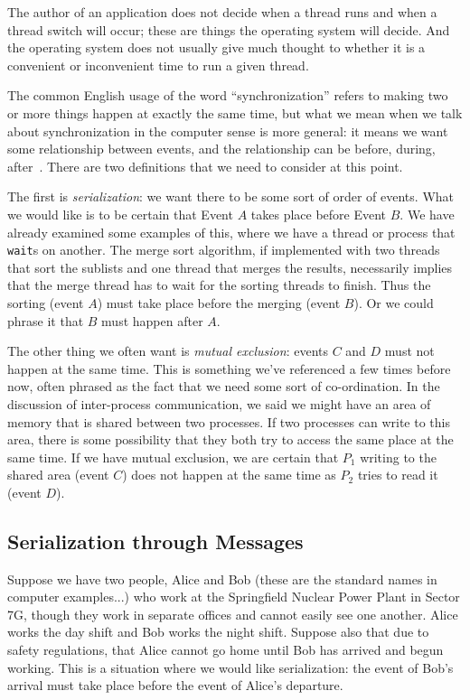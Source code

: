 \documentclass[a4paper]{report}
\begin{document}
The author of an application does not decide when a thread runs and when a thread switch will occur; these are things the operating system will decide. And the operating system does not usually give much thought to whether it is a convenient or inconvenient time to run a given thread.

The common English usage of the word ``synchronization'' refers to making two or more things happen at exactly the same time, but what we mean when we talk about synchronization in the computer sense is more general: it means we want some relationship between events, and the relationship can be before, during, after~\cite{lbs}. There are two definitions that we need to consider at this point.

The first is \textit{serialization}: we want there to be some sort of order of events. What we would like is to be certain that Event $A$ takes place before Event $B$. We have already examined some examples of this, where we have a thread or process that \texttt{wait}s on another. The merge sort algorithm, if implemented with two threads that sort the sublists and one thread that merges the results, necessarily implies that the merge thread has to wait for the sorting threads to finish. Thus the sorting (event $A$) must take place before the merging (event $B$). Or we could phrase it that $B$ must happen after $A$.

The other thing we often want is \textit{mutual exclusion}: events $C$ and $D$ must not happen at the same time. This is something we've referenced a few times before now, often phrased as the fact that we need some sort of co-ordination. In the discussion of inter-process communication, we said we might have an area of memory that is shared between two processes. If two processes can write to this area, there is some possibility that they both try to access the same place at the same time. If we have mutual exclusion, we are certain that $P_{1}$ writing to the shared area (event $C$) does not happen at the same time as $P_{2}$ tries to read it (event $D$).



\subsection*{Serialization through Messages}

Suppose we have two people, Alice and Bob (these are the standard names in computer examples...) who work at the Springfield Nuclear Power Plant in Sector 7G, though they work in separate offices and cannot easily see one another. Alice works the day shift and Bob works the night shift. Suppose also that due to safety regulations, that Alice cannot go home until Bob has arrived and begun working. This is a situation where we would like serialization: the event of Bob's arrival must take place before the event of Alice's departure.
\end{document}
